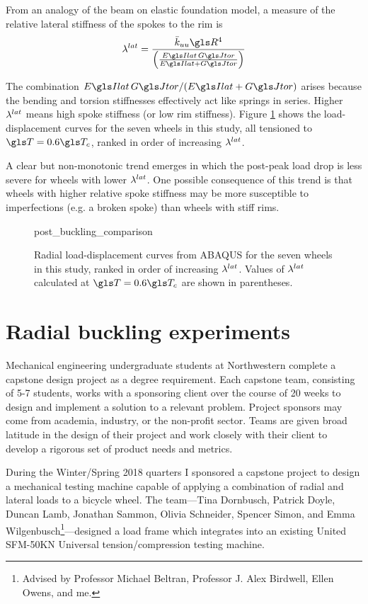 \documentclass[\rootdir/thesis.tex]{subfiles}
\begin{document}
From an analogy of the beam on elastic foundation model, a measure of the relative lateral stiffness of the spokes to the rim is
\begin{equation}
\lr^{lat} = \frac{\kuu \R^4}{\left(\frac{\EIl\,\GJ}{\EIl+\GJ}\right)}
\end{equation}

The combination $\EIl\,\GJ/(\EIl+\GJ)$ arises because the bending and torsion stiffnesses effectively act like springs in series. Higher $\lambda^{lat}$ means high spoke stiffness (or low rim stiffness). Figure \ref{fig:post_buckling_comparison} shows the load-displacement curves for the seven wheels in this study, all tensioned to $\T=0.6\T_c$, ranked in order of increasing $\lambda^{lat}$.

A clear but non-monotonic trend emerges in which the post-peak load drop is less severe for wheels with lower $\lambda^{lat}$. One possible consequence of this trend is that wheels with higher relative spoke stiffness may be more susceptible to imperfections (e.g. a broken spoke) than wheels with stiff rims.

\begin{figure}[t]
\centering
{post_buckling_comparison}
\caption{Radial load-displacement curves from ABAQUS for the seven wheels in this study, ranked in order of increasing $\lambda^{lat}$. Values of $\lambda^{lat}$ calculated at $\T=0.6\T_c$ are shown in parentheses.}
\label{fig:post_buckling_comparison}
\end{figure}

\section{Radial buckling experiments}

Mechanical engineering undergraduate students at Northwestern complete a capstone design project as a degree requirement. Each capstone team, consisting of 5-7 students, works with a sponsoring client over the course of 20 weeks to design and implement a solution to a relevant problem. Project sponsors may come from academia, industry, or the non-profit sector. Teams are given broad latitude in the design of their project and work closely with their client to develop a rigorous set of product needs and metrics.

During the Winter/Spring 2018 quarters I sponsored a capstone project to design a mechanical testing machine capable of applying a combination of radial and lateral loads to a bicycle wheel. The team---Tina Dornbusch, Patrick Doyle, Duncan Lamb, Jonathan Sammon, Olivia Schneider, Spencer Simon, and Emma Wilgenbusch\footnote{Advised by Professor Michael Beltran, Professor J. Alex Birdwell, Ellen Owens, and me.}---designed a load frame which integrates into an existing United SFM-50KN Universal tension/compression testing machine.
\end{document}
